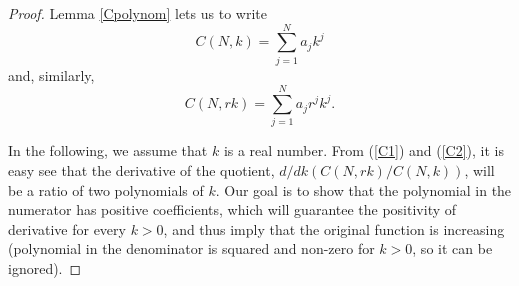 \begin{proof}
Lemma \ref{Cpolynom} lets us to write
\begin{equation}\label{C1}
C(N,k) = \sum_{j=1}^{N} a_j k^j
\end{equation}and, similarly,
\begin{equation}\label{C2}
C(N,rk) = \sum_{j=1}^{N} a_j  r^jk^j.
\end{equation}

In the following, we assume that $k$ is a real number. From (\ref{C1}) and (\ref{C2}), it is easy see that the derivative of the quotient, $d/dk (C(N,rk)/C(N,k))$, will be a ratio of two polynomials of $k$. Our goal is to show that the polynomial in the numerator has positive coefficients, which will guarantee the positivity of derivative for every $k > 0$, and thus imply that the original function is increasing (polynomial in the denominator is squared and non-zero for $k > 0$, so it can be ignored).  


\end{proof}
